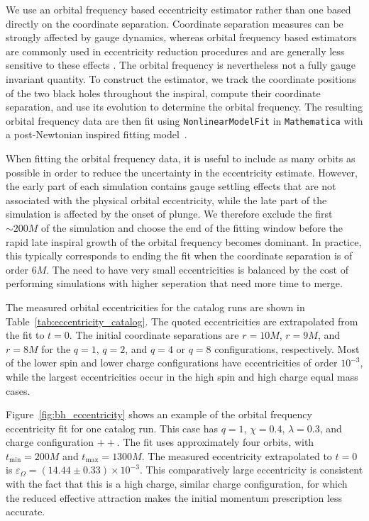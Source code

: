 We use an orbital frequency based eccentricity estimator rather than one based directly on the coordinate separation. Coordinate separation measures can be strongly affected by gauge dynamics, whereas orbital frequency based estimators are commonly used in eccentricity reduction procedures and are generally less sensitive to these effects \cite{Buonanno2011ReducingEccentricity,Lousto2013OuterLimits}. The orbital frequency is nevertheless not a fully gauge invariant quantity. To construct the estimator, we track the coordinate positions of the two black holes throughout the inspiral, compute their coordinate separation, and use its evolution to determine the orbital frequency. The resulting orbital frequency data are then fit using \verb|NonlinearModelFit| in \verb|Mathematica| with a post-Newtonian inspired fitting model~\cite{RamosBuades2019_EccRed}.

When fitting the orbital frequency data, it is useful to include as many orbits as possible in order to reduce the uncertainty in the eccentricity estimate. However, the early part of each simulation contains gauge settling effects that are not associated with the physical orbital eccentricity, while the late part of the simulation is affected by the onset of plunge. We therefore exclude the first $\sim 200M$ of the simulation and choose the end of the fitting window before the rapid late inspiral growth of the orbital frequency becomes dominant. In practice, this typically corresponds to ending the fit when the coordinate separation is of order $6M$. The need to have very small eccentricities is balanced by the cost of performing simulations with higher seperation that need more time to merge.

The measured orbital eccentricities for the catalog runs are shown in Table~\ref{tab:eccentricity_catalog}. The quoted eccentricities are extrapolated from the fit to $t=0$. The initial coordinate separations are $r=10M$, $r=9M$, and $r=8M$ for the $q=1$, $q=2$, and $q=4$ or $q=8$ configurations, respectively. Most of the lower spin and lower charge configurations have eccentricities of order $10^{-3}$, while the largest eccentricities occur in the high spin and high charge equal mass cases.

Figure~\ref{fig:bh_eccentricity} shows an example of the orbital frequency eccentricity fit for one catalog run. This case has $q=1$, $\chi=0.4$, $\lambda=0.3$, and charge configuration $++$. The fit uses approximately four orbits, with $t_{\mathrm{min}}=200M$ and $t_{\mathrm{max}}=1300M$. The measured eccentricity extrapolated to $t=0$ is $\varepsilon_\Omega=(14.44\pm0.33)\times10^{-3}$. This comparatively large eccentricity is consistent with the fact that this is a high charge, similar charge configuration, for which the reduced effective attraction makes the initial momentum prescription less accurate.

